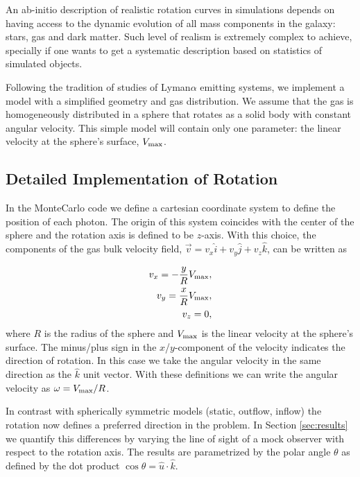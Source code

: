 \documentclass[usenatbib]{mn2e}
\begin{document}
An ab-initio description of realistic rotation curves in simulations
depends on having access to the dynamic evolution of all mass components
in the galaxy: stars, gas and dark matter. Such level of realism is
extremely complex to achieve, specially if one wants to get a
systematic description based on statistics of simulated objects.

Following the tradition of studies of Lyman$\alpha$ emitting systems,
we implement a model with a simplified geometry and gas
distribution. We assume that the gas is homogeneously distributed in a
sphere that rotates as a solid body with constant angular
velocity. This simple model will contain only one parameter: the
linear velocity at the sphere's surface, $V_{\rm max}$.

\subsection{Detailed Implementation of Rotation}

 In the MonteCarlo code we define a cartesian coordinate system to
 define the position of each photon. The origin of this system
 coincides with the center of the sphere and the rotation axis is defined
 to be $z$-axis. With this choice, the components of the gas bulk velocity
 field, $\vec{v} = v_{x}\hat{i} + v_{y}\hat{j} + v_{z}\hat{k}$, can be
 written as  
  
\begin{subequations}
\begin{align}
    v_{x}=-\dfrac{y}{R}V_{\rm max}, \label{subeq1}\\
    v_{y}=\dfrac{x}{R}V_{\rm max}, \label{subeq2}\\
    v_{z}=0, \label{subeq3}
\end{align}
\end{subequations}
%
where $R$ is the radius of the sphere and $V_{\rm max}$ is the linear
velocity at the sphere's surface. The minus/plus sign in the
$x$/$y$-component of the velocity indicates the direction of
rotation. In this case we take the angular velocity in the same
direction as the $\hat{k}$ unit vector. With these definitions we can
write the angular velocity as $\omega=V_{\rm max}/R$.  

In contrast with spherically symmetric models (static, outflow,
inflow) the rotation now defines a preferred direction in the
problem. In Section \ref{sec:results} we quantify this differences by
varying the line of sight of a mock observer with respect to the
rotation axis. The results are parametrized by the polar angle
$\theta$ as defined by the dot product $\cos\theta =
{\hat{u}\cdot\hat{k}}$. 
\end{document}
